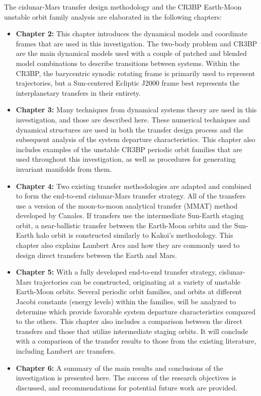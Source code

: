 The cislunar-Mars transfer design methodology and the CR3BP Earth-Moon unstable orbit family
analysis are elaborated in the following chapters:
\begin{itemize}
	\item	\textbf{Chapter 2:} This chapter introduces the dynamical models and coordinate frames
			that are used in this investigation. The two-body problem and CR3BP are the main
			dynamical models used with a couple of patched and blended model combinations to
			describe transitions between systems. Within the CR3BP, the barycentric synodic
			rotating frame is primarily used to represent trajectories, but a Sun-centered Ecliptic
			J2000 frame best represents the interplanetary transfers in their entirety.
	\item	\textbf{Chapter 3:} Many techniques from dynamical systems theory are used in this
			investigation, and those are described here. These numerical techniques and dynamical
			structures are used in both the transfer design process and the subsequent analysis of
			the system departure characteristics. This chapter also includes examples of the
			unstable CR3BP periodic orbit families that are used throughout this investigation, as
			well as procedures for generating invariant manifolds from them.
	\item	\textbf{Chapter 4:} Two existing transfer methodologies are adapted and combined to
			form the end-to-end cislunar-Mars transfer strategy. All of the transfers use a version
			of the moon-to-moon analytical transfer (MMAT) method developed by
			Canales\cite{Canales:2021}. If transfers use the intermediate Sun-Earth staging orbit,
			a near-ballistic transfer between the Earth-Moon orbits and the Sun-Earth halo orbit is
			constructed similarly to Kakoi's methodology\cite{Kakoi:2015}. This chapter also explains
			Lambert Arcs and how they are commonly used to design direct transfers between the
			Earth and Mars.
	\item	\textbf{Chapter 5:} With a fully developed end-to-end transfer strategy, cislunar-Mars
			trajectories can be constructed, originating at a variety of unstable Earth-Moon
			orbits. Several periodic orbit families, and orbits at different Jacobi constants
			(energy levels) within the families, will be analyzed to determine which provide
			favorable system departure characteristics compared to the others. This chapter also
			includes a comparison between the direct transfers and those that utilize intermediate
			staging orbits. It will conclude with a comparison of the transfer results to those
			from the existing literature, including Lambert arc transfers.
	\item	\textbf{Chapter 6:} A summary of the main results and conclusions of the investigation
			is presented here. The success of the research objectives is discussed, and
			recommendations for potential future work are provided.
\end{itemize}
